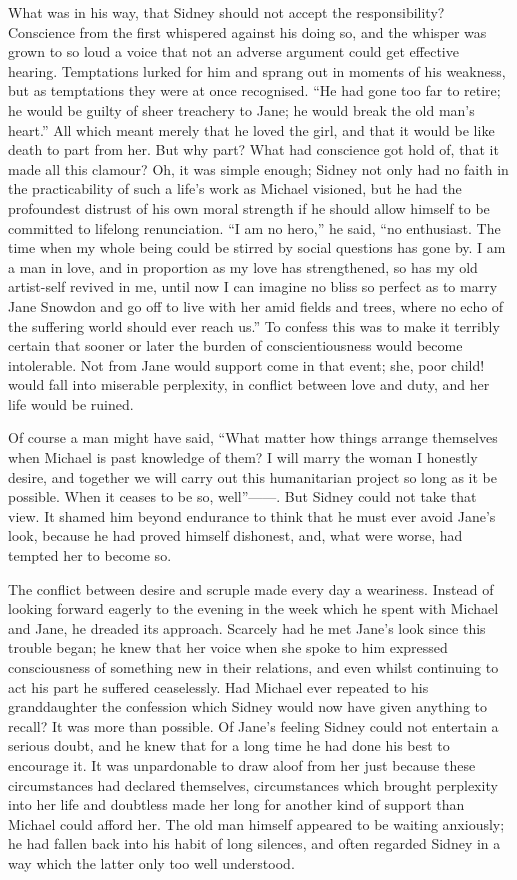 What was in his way, that Sidney should not accept the responsibility?
Conscience from the first whispered against his doing so, and the
whisper was grown to so loud a voice that not an adverse argument could
get effective hearing. Temptations lurked for him and sprang out in
moments of his weakness, but as temptations they were at once
recognised. ``He had gone too far to retire; he would be guilty of sheer
treachery to Jane; he would break the old man's heart.'' All which meant
merely that he loved the girl, and that it would be like death to part
from her. But why part? What had conscience got hold of, that it made
all this clamour? Oh, it was simple enough; Sidney not only had no faith
in the practicability of such a life's work as Michael visioned, but he
had the profoundest distrust {}of his own moral strength if he should
allow himself to be committed to lifelong renunciation. ``I am no
hero,'' he said, ``no enthusiast. The time when my whole being could be
stirred by social questions has gone by. I am a man in love, and in
proportion as my love has strengthened, so has my old artist-self
revived in me, until now I can imagine no bliss so perfect as to marry
Jane Snowdon and go off to live with her amid fields and trees, where no
echo of the suffering world should ever reach us.'' To confess this was
to make it terribly certain that sooner or later the burden of
conscientiousness would become intolerable. Not from Jane would support
come in that event; she, poor child! would fall into miserable
perplexity, in conflict between love and duty, and her life would be
ruined.

Of course a man might have said, ``What matter how things arrange
themselves when Michael is past knowledge of them? I will marry the
woman I honestly desire, and together we will carry out this
humanitarian {}project so long as it be possible. When it ceases to be
so, well''{{------}}. But Sidney could not take that view. It shamed him
beyond endurance to think that he must ever avoid Jane's look, because
he had proved himself dishonest, and, what were worse, had tempted her
to become so.

The conflict between desire and scruple made every day a weariness.
Instead of looking forward eagerly to the evening in the week which he
spent with Michael and Jane, he dreaded its approach. Scarcely had he
met Jane's look since this trouble began; he knew that her voice when
she spoke to him expressed consciousness of something new in their
relations, and even whilst continuing to act his part he suffered
ceaselessly. Had Michael ever repeated to his granddaughter the
confession which Sidney would now have given anything to recall? It was
more than possible. Of Jane's feeling Sidney could not entertain a
serious doubt, and he knew that for a long time he had done his best to
encourage it. It was unpardonable to draw aloof {}from her just because
these circumstances had declared themselves, circumstances which brought
perplexity into her life and doubtless made her long for another kind of
support than Michael could afford her. The old man himself appeared to
be waiting anxiously; he had fallen back into his habit of long
silences, and often regarded Sidney in a way which the latter only too
well understood.

